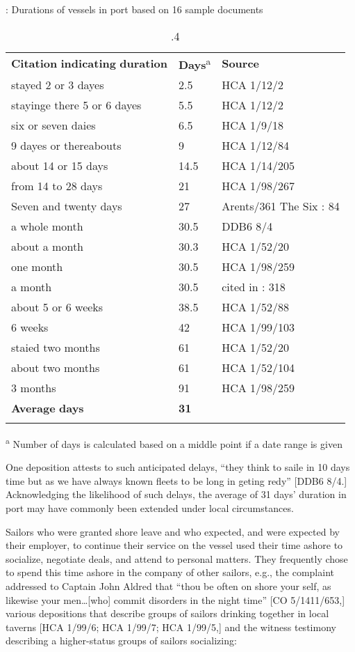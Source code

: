 \begin{table}
\caption{\label{tab:key:4}.4}: Durations of vessels in port based on 16 sample documents

\begin{tabularx}{\textwidth}{XXX}
\lsptoprule

\textbf{Citation} \textbf{indicating} \textbf{duration} & \textbf{Days}\textsuperscript{a} & \textbf{Source}\\
 stayed 2 or 3 dayes & 2.5 & HCA 1/12/2\\
stayinge there 5 or 6 dayes & 5.5 & HCA 1/12/2\\
six or seven daies & 6.5 & HCA 1/9/18\\
9 dayes or thereabouts & 9 & HCA 1/12/84\\
about 14 or 15 days & 14.5 & HCA 1/14/205\\
from 14 to 28 days & 21 & HCA 1/98/267\\
Seven and twenty days & 27 & Arents/361 The Six \citealt{Voyages1678}: 84\\
a whole month & 30.5 & DDB6 8/4\\
about a month & 30.3 & HCA 1/52/20\\
one month & 30.5 & HCA 1/98/259\\
a month & 30.5 & cited in \citealt{Bicheno2012}: 318\\
about 5 or 6 weeks & 38.5 & HCA 1/52/88\\
6 weeks & 42 & HCA 1/99/103\\
staied two months & 61 & HCA 1/52/20\\
about two months & 61 & HCA 1/52/104\\
3 months & 91 & HCA 1/98/259\\
 \textbf{Average} \textbf{days} & \textbf{31} & \\
\lspbottomrule
\end{tabularx}
\end{table}
\textsuperscript{a}\textbf{\textsuperscript{} }Number of days is calculated based on a middle point if a date range is given 

One deposition attests to such anticipated delays, “they think to saile in 10 days time but as we have always known fleets to be long in geting redy” [DDB6 8/4.] Acknowledging the likelihood of such delays, the average of 31 days’ duration in port may have commonly been extended under local circumstances.

  Sailors who were granted shore leave and who expected, and were expected by their employer, to continue their service on the vessel used their time ashore to socialize, negotiate deals, and attend to personal matters. They frequently chose to spend this time ashore in the company of other sailors, e.g., the complaint addressed to Captain John Aldred that “thou be often on shore your self, as likewise your men…[who] commit disorders in the night time” [CO 5/1411/653,] various depositions that describe groups of sailors drinking together in local taverns [HCA 1/99/6; HCA 1/99/7; HCA 1/99/5,] and the witness testimony describing a higher-status groups of sailors socializing:

